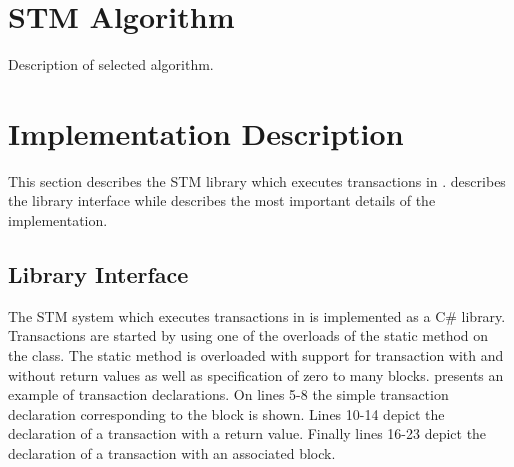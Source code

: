 %
%

\section{STM Algorithm}
Description of selected algorithm.

\section{Implementation Description}
This section describes the \ac{STM} library which executes transactions in \stmnamesp.  describes the library interface while  describes the most important details of the implementation.
\subsection{Library Interface} 
\label{sec:stm_library_interface}
The \ac{STM} system which executes transactions in \stmnamesp is implemented as a C\# library. Transactions are started by using one of the overloads of the static  method on the  class. The static method  is overloaded with support for transaction with and without return values as well as specification of zero to many  blocks.  presents an example of transaction declarations. On lines 5-8 the simple transaction declaration corresponding to the  block is shown. Lines 10-14 depict the declaration of a transaction with a return value. Finally lines 16-23 depict the declaration of a transaction with an associated  block. 

